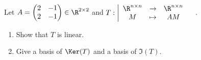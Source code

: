 \documentclass[11pt,nocut]{article}
\begin{document}
\begin{problem}[$\star$]
	Let $A 
	= \begin{pmatrix}
		2 & -1 \\
		2 & -1
	\end{pmatrix}
	\in \R^{2 \times 2}$ 
	and $\displaystyle
	T: \left| 
	\begin{array}{ccc}
		\R^{n \times n} & \to & \R^{n \times n}\\
		M & \mapsto & AM
	\end{array}
\right.\quad$.
\begin{enumerate}[label=\normalfont(\textbf{\alph*})]
	\item Show that $T$ is linear. 
	\item Give a basis of $\Ker(T)$ and a basis of $\Im(T)$.
\end{enumerate} 
\end{problem}



%
%
\end{document}
